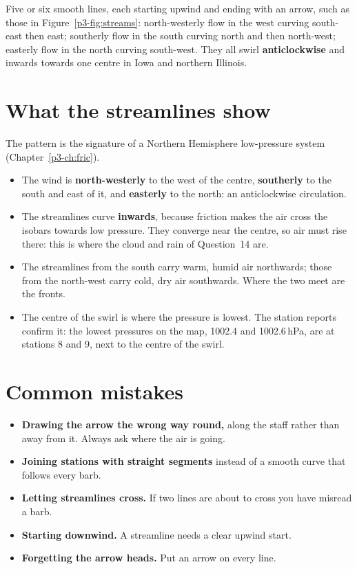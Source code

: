 \begin{answerbox}
Five or six smooth lines, each starting upwind and ending with an arrow, such as those in Figure~\ref{p3-fig:streams}: north-westerly flow in the west curving south-east then east; southerly flow in the south curving north and then north-west; easterly flow in the north curving south-west. They all swirl \textbf{anticlockwise} and inwards towards one centre in Iowa and northern Illinois.
\end{answerbox}

\section{What the streamlines show}

The pattern is the signature of a Northern Hemisphere low-pressure system (Chapter~\ref{p3-ch:fric}).
\begin{itemize}
\item The wind is \textbf{north-westerly} to the west of the centre, \textbf{southerly} to the south and east of it, and \textbf{easterly} to the north: an anticlockwise circulation.
\item The streamlines curve \textbf{inwards}, because friction makes the air cross the isobars towards low pressure. They converge near the centre, so air must rise there: this is where the cloud and rain of Question~14 are.
\item The streamlines from the south carry warm, humid air northwards; those from the north-west carry cold, dry air southwards. Where the two meet are the fronts.
\item The centre of the swirl is where the pressure is lowest. The station reports confirm it: the lowest pressures on the map, 1002.4 and 1002.6\,hPa, are at stations 8 and 9, next to the centre of the swirl.
\end{itemize}

\section{Common mistakes}

\begin{itemize}
\item \textbf{Drawing the arrow the wrong way round,} along the staff rather than away from it. Always ask where the air is going.
\item \textbf{Joining stations with straight segments} instead of a smooth curve that follows every barb.
\item \textbf{Letting streamlines cross.} If two lines are about to cross you have misread a barb.
\item \textbf{Starting downwind.} A streamline needs a clear upwind start.
\item \textbf{Forgetting the arrow heads.} Put an arrow on every line.
\end{itemize}

